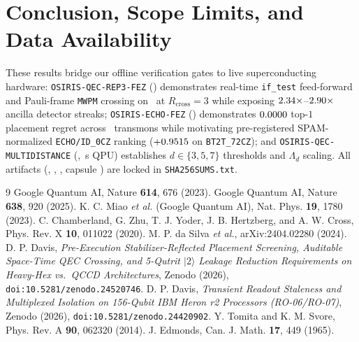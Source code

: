 \documentclass[aps,prx,twocolumn,superscriptaddress,nofootinbib]{revtex4-2}
\begin{document}
\section{Conclusion, Scope Limits, and Data Availability}
These results bridge our offline verification gates to live superconducting hardware: \texttt{OSIRIS-QEC-REP3-FEZ} (\remRepJobId) demonstrates real-time \texttt{if\_test} feed-forward and Pauli-frame \texttt{MWPM} crossing on \remBackend\ at $R_{\mathrm{cross}} = 3$ while exposing $2.34\times$--$2.90\times$ ancilla detector streaks; \texttt{OSIRIS-ECHO-FEZ} (\remEchoJobId) demonstrates $0.0000$ top-$1$ placement regret across \remEchoTotalTransmons\ transmons while motivating pre-registered SPAM-normalized \texttt{ECHO/ID\_0CZ} ranking ($+0.9515$ on \texttt{BT2T\_72CZ}); and \texttt{OSIRIS-QEC-MULTIDISTANCE} (\remSimTier, \remSimQpuSec\,s QPU) establishes $d \in \{3, 5, 7\}$ thresholds and $\Lambda_d$ scaling. All artifacts (\remRepResultsShaPrefix, \remEchoResultsShaPrefix, \remMultidistRepShaPrefix, capsule \remCapsuleSha) are locked in \texttt{SHA256SUMS.txt}.

\begin{thebibliography}{9}
 Google Quantum AI, Nature \textbf{614}, 676 (2023).
 Google Quantum AI, Nature \textbf{638}, 920 (2025).
 K. C. Miao \emph{et al.} (Google Quantum AI), Nat. Phys. \textbf{19}, 1780 (2023).
 C. Chamberland, G. Zhu, T. J. Yoder, J. B. Hertzberg, and A. W. Cross, Phys. Rev. X \textbf{10}, 011022 (2020).
 M. P. da Silva \emph{et al.}, arXiv:2404.02280 (2024).
 D. P. Davis, \emph{Pre-Execution Stabilizer-Reflected Placement Screening, Auditable Space-Time QEC Crossing, and 5-Qutrit $|2\rangle$ Leakage Reduction Requirements on Heavy-Hex vs.\ QCCD Architectures}, Zenodo (2026), \texttt{doi:10.5281/zenodo.24520746}.
 D. P. Davis, \emph{Transient Readout Staleness and Multiplexed Isolation on 156-Qubit IBM Heron r2 Processors (RO-06/RO-07)}, Zenodo (2026), \texttt{doi:10.5281/zenodo.24420902}.
 Y. Tomita and K. M. Svore, Phys. Rev. A \textbf{90}, 062320 (2014).
 J. Edmonds, Can. J. Math. \textbf{17}, 449 (1965).
\end{thebibliography}
\end{document}
